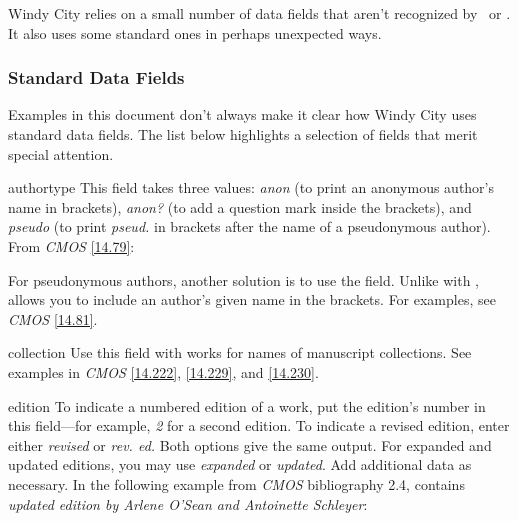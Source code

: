 \documentclass[11pt,letterpaper,oneside]{article}
\begin{document}
Windy City relies on a small number of data fields that aren't
recognized by \BibTeX\ or \biblatex. It also uses some standard ones
in perhaps unexpected ways.

\subsubsection{Standard Data Fields}
\label{stdfields}

Examples in this document don't always make it clear how Windy City
uses standard data fields. The list below highlights a selection of
fields that merit special attention.

\begin{marglist}

\item[authortype] This field takes three values: \textit{anon} (to
print an anonymous author's name in brackets), \textit{anon?} (to add
a question mark inside the brackets), and \textit{pseudo} (to print
\textit{pseud.} in brackets after the name of a pseudonymous author).
From \textit{CMOS} \ref{14.79}:

\begin{citebib}
\item \cite{horsley1796}
\item \cite{hawkes1834}
\end{citebib}

For pseudonymous authors, another solution is to use the
 field. Unlike with ,
 allows you to include an author's given name in
the brackets. For examples, see \textit{CMOS} \ref{14.81}.

\item[collection] Use this field with  works for
names of manuscript collections. See examples in \textit{CMOS}
\ref{14.222}, \ref{14.229}, and \ref{14.230}.

\item[edition] To indicate a numbered edition of a work, put the
edition's number in this field---for example, \textit{2} for a second
edition. To indicate a revised edition, enter either \textit{revised}
or \textit{rev. ed.} Both options give the same output. For expanded
and updated editions, you may use \textit{expanded} or
\textit{updated}. Add additional data as necessary. In the following
example from \textit{CMOS} bibliography 2.4, 
contains \textit{updated edition by Arlene O'Sean and Antoinette
Schleyer}:


\end{marglist}
\end{document}
